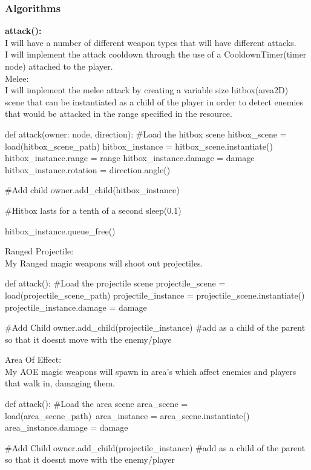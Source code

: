 \documentclass{article}
\begin{document}
        \subsubsection{Algorithms}
        \textbf{attack():}\\
        I will have a number of different weapon types that will have different attacks.\\
        I will implement the attack cooldown through the use of a CooldownTimer(timer node) attached to the player.\\
        Melee:\\
        I will implement the melee attack by creating a variable size hitbox(area2D) scene that can be instantiated as a child of the player in order to detect enemies that would be attacked in the range specified in the resource.\\
        \begin{python}
def attack(owner: node, direction):
   #Load the hitbox scene
   hitbox_scene = load(hitbox_scene_path)
   hitbox_instance = hitbox_scene.instantiate()
   hitbox_instance.range = range
   hitbox_instance.damage = damage
   hitbox_instance.rotation = direction.angle()

   #Add child
   owner.add_child(hitbox_instance)

   #Hitbox lasts for a tenth of a second
   sleep(0.1)
   
   hitbox_instance.queue_free()

        \end{python}
        Ranged Projectile:\\
        My Ranged magic weapons will shoot out projectiles.\\
        \begin{python}
def attack():
   #Load the projectile scene
   projectile_scene = load(projectile_scene_path)
   projectile_instance = projectile_scene.instantiate()
   projectile_instance.damage = damage

   #Add Child
   owner.add_child(projectile_instance) #add as a child of the parent so that it doesnt move with the enemy/playe
        \end{python}
        Area Of Effect:\\
        My AOE magic weapons will spawn in area's which affect enemies and players that walk in, damaging them.\\
        \begin{python}
def attack():
   #Load the area scene
   area_scene = load(area_scene_path)\
   area_instance = area_scene.instantiate()
   area_instance.damage = damage

   #Add Child
   owner.add_child(projectile_instance) #add as a child of the parent so that it doesnt move with the enemy/player
        \end{python}
\end{document}
